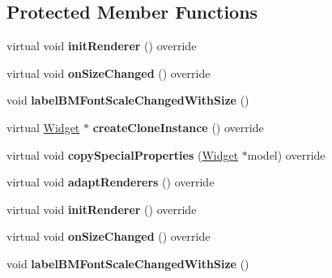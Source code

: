 \subsection*{Protected Member Functions}
\begin{DoxyCompactItemize}
\item 
\mbox{\label{classui_1_1TextBMFont_a662028e5240b6858b4132fc8b190ec38}} 
virtual void {\bfseries init\+Renderer} () override
\item 
\mbox{\label{classui_1_1TextBMFont_a49300c4703d3b06c15005123a3db6181}} 
virtual void {\bfseries on\+Size\+Changed} () override
\item 
\mbox{\label{classui_1_1TextBMFont_a3e55e099f2da4a79d28035cb7bc8c6da}} 
void {\bfseries label\+B\+M\+Font\+Scale\+Changed\+With\+Size} ()
\item 
\mbox{\label{classui_1_1TextBMFont_a3f8a0b2d3211e9173bf4b691126abe5d}} 
virtual \hyperlink{classui_1_1Widget}{Widget} $\ast$ {\bfseries create\+Clone\+Instance} () override
\item 
\mbox{\label{classui_1_1TextBMFont_af33cfc6d7917d9519eee5e6162470aea}} 
virtual void {\bfseries copy\+Special\+Properties} (\hyperlink{classui_1_1Widget}{Widget} $\ast$model) override
\item 
\mbox{\label{classui_1_1TextBMFont_aed37b74981878e348e5d8a08a5f46485}} 
virtual void {\bfseries adapt\+Renderers} () override
\item 
\mbox{\label{classui_1_1TextBMFont_ae43f0ebbf690e6389d8dd8f6ea210df1}} 
virtual void {\bfseries init\+Renderer} () override
\item 
\mbox{\label{classui_1_1TextBMFont_aacd91b77db88ee1ab8c95442b4ac1767}} 
virtual void {\bfseries on\+Size\+Changed} () override
\item 
\mbox{\label{classui_1_1TextBMFont_a3e55e099f2da4a79d28035cb7bc8c6da}} 
void {\bfseries label\+B\+M\+Font\+Scale\+Changed\+With\+Size} ()
\item 

\end{DoxyCompactItemize}
